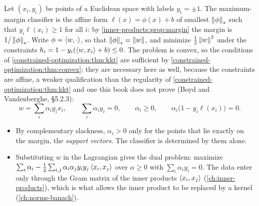 \begin{notechapter}
\begin{mlthread}
Let $(x_i, y_i)$ be points of a Euclidean space with labels $y_i = \pm1$.
The maximum-margin classifier is the affine form
$\ell(x) = \phi(x) + b$ of smallest $\left\|\phi\right\|_*$ such that
$y_i\ell(x_i)\geq1$ for all $i$: by \cref{inner-products:prop:margin} the
margin is $1/\left\|\phi\right\|_*$. Write $\phi = \left\langle w, \cdot \right\rangle$, so that
$\left\|\phi\right\|_* = \left\|w\right\|$, and minimize $\frac12\left\|w\right\|^2$ under the
constraints $h_i = 1 - y_i(\left\langle w, x_i \right\rangle + b)\leq0$. The problem is
convex, so the conditions of \cref{constrained-optimization:thm:kkt} are
sufficient by \cref{constrained-optimization:thm:convex}; they are
necessary here as well, because the constraints are affine, a weaker
qualification than the regularity of
\cref{constrained-optimization:thm:kkt} and one this book does not
prove (Boyd and Vandenberghe, \S5.2.3):
\[
  w = \sum_i\alpha_iy_ix_i, \qquad \sum_i\alpha_iy_i = 0, \qquad
  \alpha_i\geq0, \qquad \alpha_i\bigl(1 - y_i\ell(x_i)\bigr) = 0 .
\]
\begin{itemize}[nosep]
  \item By complementary slackness, $\alpha_i > 0$ only for the points
        that lie exactly on the margin, the \emph{support vectors}. The
        classifier is determined by them alone.
  \item Substituting $w$ in the Lagrangian gives the dual problem:
        maximize
        $\sum_i\alpha_i
        - \frac12\sum_{i,j}\alpha_i\alpha_jy_iy_j\left\langle x_i, x_j \right\rangle$
        over $\alpha\geq0$ with $\sum_i\alpha_iy_i = 0$. The data enter
        only through the Gram matrix of the inner products
        $\left\langle x_i, x_j \right\rangle$ (\cref{ch:inner-products}), which is what
        allows the inner product to be replaced by a kernel
        (\cref{ch:norms-banach}).
\end{itemize}
\end{mlthread}


\end{notechapter}
